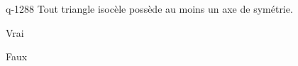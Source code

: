 \begin{truefalse}{q-1288}
Tout triangle isocèle possède au moins un axe de symétrie.
\item* Vrai
\item Faux
\end{truefalse}

